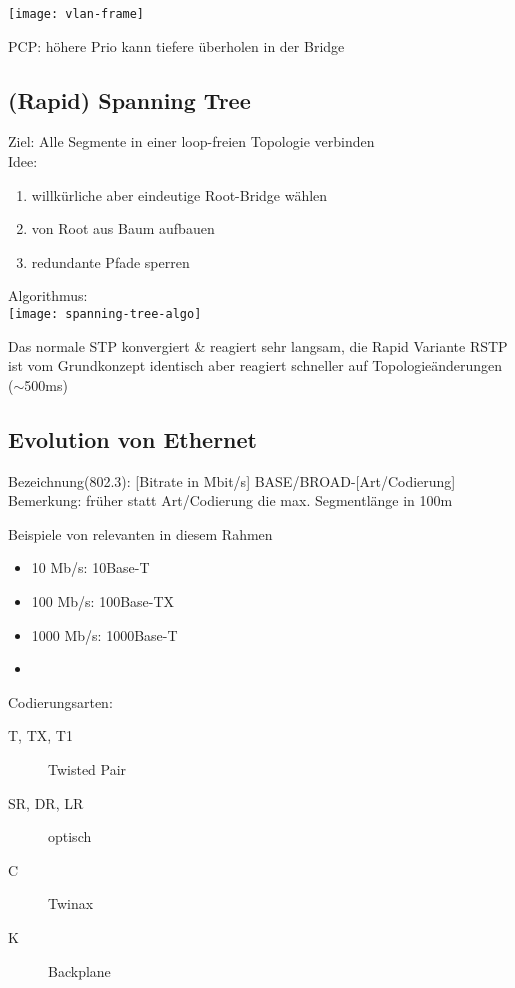 \begin{center}
	\texttt{[image: vlan-frame]}
\end{center}

PCP: höhere Prio kann tiefere überholen in der Bridge


\subsection{(Rapid) Spanning Tree}

Ziel: Alle Segmente in einer loop-freien Topologie verbinden \\
Idee: \begin{enumerate}
	\item willkürliche aber eindeutige Root-Bridge wählen
	\item von Root aus Baum aufbauen
	\item redundante Pfade sperren
\end{enumerate}

Algorithmus: \\
\texttt{[image: spanning-tree-algo]}

Das normale STP konvergiert \& reagiert sehr langsam, die Rapid Variante RSTP
ist vom Grundkonzept identisch aber reagiert schneller auf Topologieänderungen ($\sim$500ms)



\subsection{Evolution von Ethernet}

Bezeichnung(802.3): [Bitrate in Mbit/s] BASE/BROAD-[Art/Codierung]
\small{Bemerkung: früher statt Art/Codierung die max. Segmentlänge in 100m}

\begin{multicols*}{2}
	Beispiele von relevanten in diesem Rahmen
	\begin{itemize}
		\item 10 Mb/s: 10Base-T
		\item 100 Mb/s: 100Base-TX
		\item 1000 Mb/s: 1000Base-T
		\item[\vspace{\fill}]
	\end{itemize}
	\columnbreak
	Codierungsarten:
	\begin{description}
		\item[T, TX, T1] Twisted Pair
		\item[SR, DR, LR] optisch
		\item[C] Twinax
		\item[K] Backplane
	\end{description}
\end{multicols*}

